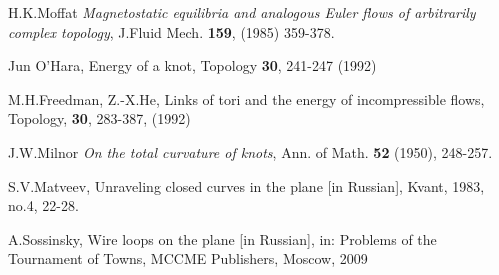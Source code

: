\documentclass[12pt]{book}
\begin{document}
\smallskip
[8] H.K.Moffat {\it Magnetostatic equilibria and analogous Euler flows of arbitrarily complex topology}, J.Fluid Mech. {\bf 159}, (1985) 359-378.

\smallskip
[9] Jun O'Hara, Energy of a knot, Topology {\bf 30}, 241-247 (1992)  

\smallskip
[10] M.H.Freedman, Z.-X.He, Links of tori and the energy of incompressible flows, Topology, {\bf 30}, 283-387, (1992)

\smallskip
[11] J.W.Milnor {\it On the total curvature of knots}, Ann. of Math. {\bf 52} (1950), 
248-257.

\smallskip
[12] S.V.Matveev, Unraveling closed curves in the plane  [in Russian], Kvant, 1983, 
no.4, 22-28. 

\smallskip
[13] A.Sossinsky, Wire loops on the plane [in Russian], in: Problems of the Tournament of Towns, MCCME Publishers, Moscow, 2009
\end{document}
